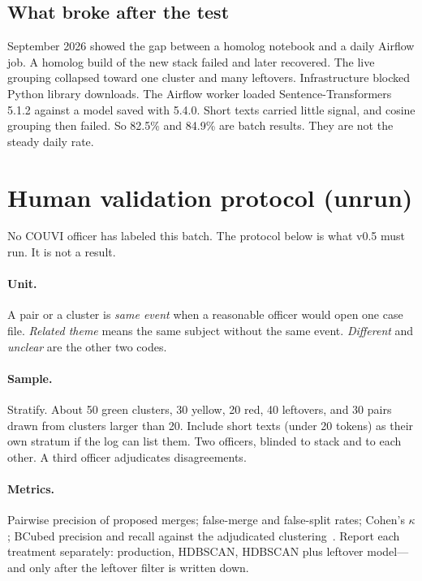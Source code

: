 \documentclass[acmlarge,screen]{acmart}
\begin{document}
\subsection{What broke after the test}

September 2026 showed the gap between a homolog notebook and a daily Airflow job. A homolog build of the new stack failed and later recovered. The live grouping collapsed toward one cluster and many leftovers. Infrastructure blocked Python library downloads. The Airflow worker loaded Sentence-Transformers 5.1.2 against a model saved with 5.4.0. Short texts carried little signal, and cosine grouping then failed. So 82.5\% and 84.9\% are batch results. They are not the steady daily rate.

\section{Human validation protocol (unrun)}

No COUVI officer has labeled this batch. The protocol below is what v0.5 must run. It is not a result.

\paragraph{Unit.} A pair or a cluster is \emph{same event} when a reasonable officer would open one case file. \emph{Related theme} means the same subject without the same event. \emph{Different} and \emph{unclear} are the other two codes.

\paragraph{Sample.} Stratify. About 50 green clusters, 30 yellow, 20 red, 40 leftovers, and 30 pairs drawn from clusters larger than 20. Include short texts (under 20 tokens) as their own stratum if the log can list them. Two officers, blinded to stack and to each other. A third officer adjudicates disagreements.

\paragraph{Metrics.} Pairwise precision of proposed merges; false-merge and false-split rates; Cohen's $\kappa$; BCubed precision and recall against the adjudicated clustering~\cite{amigo2009bcubed}. Report each treatment separately: production, HDBSCAN, HDBSCAN plus leftover model---and only after the leftover filter is written down.
\end{document}
